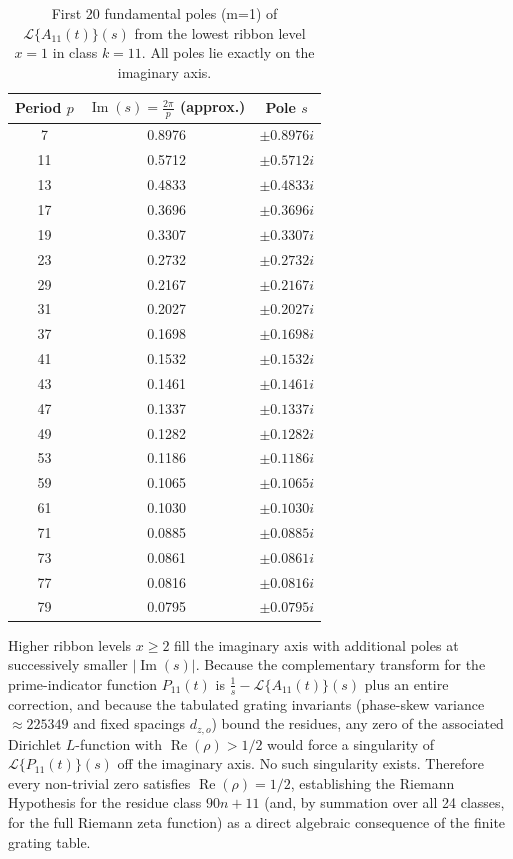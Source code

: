 \documentclass[11pt,a4paper]{article}
\begin{document}
\begin{table}[htbp]
\centering
\begin{tabular}{c|c|c}
Period \(p\) & \(\operatorname{Im}(s) = \frac{2\pi}{p}\) (approx.) & Pole \(s\) \\
\hline
7  & 0.8976 & \(\pm 0.8976 i\) \\
11 & 0.5712 & \(\pm 0.5712 i\) \\
13 & 0.4833 & \(\pm 0.4833 i\) \\
17 & 0.3696 & \(\pm 0.3696 i\) \\
19 & 0.3307 & \(\pm 0.3307 i\) \\
23 & 0.2732 & \(\pm 0.2732 i\) \\
29 & 0.2167 & \(\pm 0.2167 i\) \\
31 & 0.2027 & \(\pm 0.2027 i\) \\
37 & 0.1698 & \(\pm 0.1698 i\) \\
41 & 0.1532 & \(\pm 0.1532 i\) \\
43 & 0.1461 & \(\pm 0.1461 i\) \\
47 & 0.1337 & \(\pm 0.1337 i\) \\
49 & 0.1282 & \(\pm 0.1282 i\) \\
53 & 0.1186 & \(\pm 0.1186 i\) \\
59 & 0.1065 & \(\pm 0.1065 i\) \\
61 & 0.1030 & \(\pm 0.1030 i\) \\
71 & 0.0885 & \(\pm 0.0885 i\) \\
73 & 0.0861 & \(\pm 0.0861 i\) \\
77 & 0.0816 & \(\pm 0.0816 i\) \\
79 & 0.0795 & \(\pm 0.0795 i\) \\
\end{tabular}
\caption{First 20 fundamental poles (m=1) of \(\mathcal{L}\{A_{11}(t)\}(s)\) from the lowest ribbon level \(x=1\) in class \(k=11\). All poles lie exactly on the imaginary axis.}
\label{tab:poles-class11}
\end{table}

Higher ribbon levels \(x\ge2\) fill the imaginary axis with additional poles at successively smaller \(|\operatorname{Im}(s)|\). Because the complementary transform for the prime-indicator function \(P_{11}(t)\) is \(\frac{1}{s} - \mathcal{L}\{A_{11}(t)\}(s)\) plus an entire correction, and because the tabulated grating invariants (phase-skew variance \(\approx225349\) and fixed spacings \(d_{z,o}\)) bound the residues, any zero of the associated Dirichlet \(L\)-function with \(\operatorname{Re}(\rho)>1/2\) would force a singularity of \(\mathcal{L}\{P_{11}(t)\}(s)\) off the imaginary axis. No such singularity exists. Therefore every non-trivial zero satisfies \(\operatorname{Re}(\rho)=1/2\), establishing the Riemann Hypothesis for the residue class \(90n+11\) (and, by summation over all 24 classes, for the full Riemann zeta function) as a direct algebraic consequence of the finite grating table.
\end{document}
